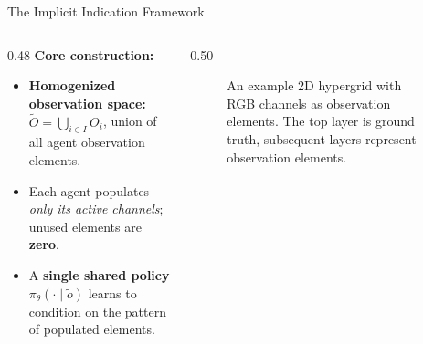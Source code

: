 \begin{frame}[shrink=5]{The Implicit Indication Framework}
\vspace{1.5em}
\begin{columns}
    \begin{column}{0.48\textwidth}
        \textbf{Core construction:}
        \begin{itemize}
            \item \textbf{Homogenized observation space:}
                $\widetilde{{O}} = \bigcup_{i \in {I}} {O}_i$,
                union of all agent observation elements.
            \item Each agent populates \emph{only its active channels};
                unused elements are \textbf{zero}.
            \item A \textbf{single shared policy} $\pi_\theta(\cdot \mid \tilde{o})$
                learns to condition on the pattern of populated elements.
        \end{itemize}
    \end{column}
    \begin{column}{0.50\textwidth}
        \begin{figure}
            \centering
            \resizebox{!}{0.75\linewidth}{%
                }
            \caption{An example 2D hypergrid with RGB channels as observation elements.
                The top layer is ground truth, subsequent layers represent observation elements.}
                \label{fig:rgb_hypergrid_example}
        \end{figure}
    \end{column}
\end{columns}

\end{frame}


